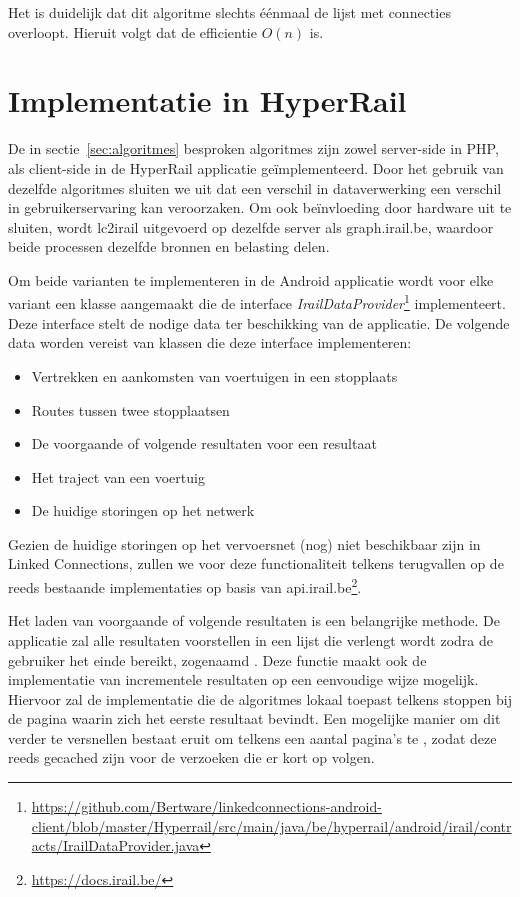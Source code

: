 Het is duidelijk dat dit algoritme slechts éénmaal de lijst met connecties overloopt. Hieruit volgt dat de efficientie $O(n)$ is.
\section {Implementatie in HyperRail}
De in sectie~\ref{sec:algoritmes} besproken algoritmes zijn zowel server-side in PHP, als client-side in de HyperRail applicatie geïmplementeerd. Door het gebruik van dezelfde algoritmes sluiten we uit dat een verschil in dataverwerking een verschil in gebruikerservaring kan veroorzaken. Om ook beïnvloeding door hardware uit te sluiten, wordt lc2irail uitgevoerd op dezelfde server als graph.irail.be, waardoor beide processen dezelfde bronnen en belasting delen.

Om beide varianten te implementeren in de Android applicatie wordt voor elke variant een klasse aangemaakt die de interface \emph{IrailDataProvider}\footnote{\url{https://github.com/Bertware/linkedconnections-android-client/blob/master/Hyperrail/src/main/java/be/hyperrail/android/irail/contracts/IrailDataProvider.java}} implementeert. Deze interface stelt de nodige data ter beschikking van de applicatie. De volgende data worden vereist van klassen die deze interface implementeren:

\begin{itemize}
	\item Vertrekken en aankomsten van voertuigen in een stopplaats
	\item Routes tussen twee stopplaatsen
	\item De voorgaande of volgende resultaten voor een resultaat
	\item Het traject van een voertuig
	\item De huidige storingen op het netwerk
\end{itemize}

Gezien de huidige storingen op het vervoersnet (nog) niet beschikbaar zijn in Linked Connections, zullen we voor deze functionaliteit telkens terugvallen op de reeds bestaande implementaties op basis van api.irail.be\footnote{\url{https://docs.irail.be/}}.

Het laden van voorgaande of volgende resultaten is een belangrijke methode. De applicatie zal alle resultaten voorstellen in een lijst die verlengt wordt zodra de gebruiker het einde bereikt, zogenaamd . Deze functie maakt ook de implementatie van incrementele resultaten op een eenvoudige wijze mogelijk. Hiervoor zal de implementatie die de algoritmes lokaal toepast telkens stoppen bij de pagina waarin zich het eerste resultaat bevindt. Een mogelijke manier om dit verder te versnellen bestaat eruit om telkens een aantal pagina's te , zodat deze reeds gecached zijn voor de verzoeken die er kort op volgen.


